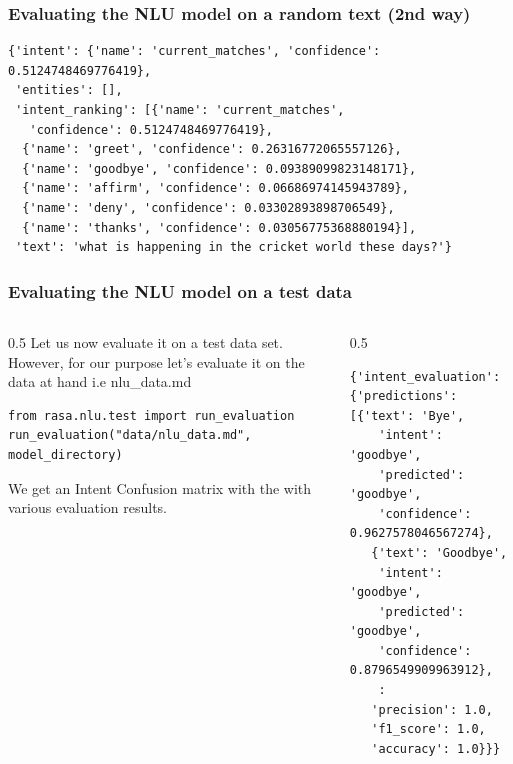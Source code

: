  \begin{frame}[fragile]\frametitle{Evaluating the NLU model on a random text (2nd way)}

\begin{lstlisting}
{'intent': {'name': 'current_matches', 'confidence': 0.5124748469776419},
 'entities': [],
 'intent_ranking': [{'name': 'current_matches',
   'confidence': 0.5124748469776419},
  {'name': 'greet', 'confidence': 0.26316772065557126},
  {'name': 'goodbye', 'confidence': 0.09389099823148171},
  {'name': 'affirm', 'confidence': 0.06686974145943789},
  {'name': 'deny', 'confidence': 0.03302893898706549},
  {'name': 'thanks', 'confidence': 0.03056775368880194}],
 'text': 'what is happening in the cricket world these days?'}
\end{lstlisting}

\end{frame}



 \begin{frame}[fragile]\frametitle{Evaluating the NLU model on a test data}
 
    \begin{columns}
    \begin{column}[t]{0.5\linewidth}
Let us now evaluate it on a test data set. However, for our purpose let's evaluate it on the data at hand i.e nlu\_data.md
\begin{lstlisting}
from rasa.nlu.test import run_evaluation
run_evaluation("data/nlu_data.md", model_directory)
\end{lstlisting}

We get an Intent Confusion matrix with the with various evaluation results.
    \end{column}
    \begin{column}[t]{0.5\linewidth}
\begin{lstlisting}
{'intent_evaluation': {'predictions': [{'text': 'Bye',
    'intent': 'goodbye',
    'predicted': 'goodbye',
    'confidence': 0.9627578046567274},
   {'text': 'Goodbye',
    'intent': 'goodbye',
    'predicted': 'goodbye',
    'confidence': 0.8796549909963912},
	:
   'precision': 1.0,
   'f1_score': 1.0,
   'accuracy': 1.0}}}
\end{lstlisting}
    \end{column}
  \end{columns}
\end{frame}

